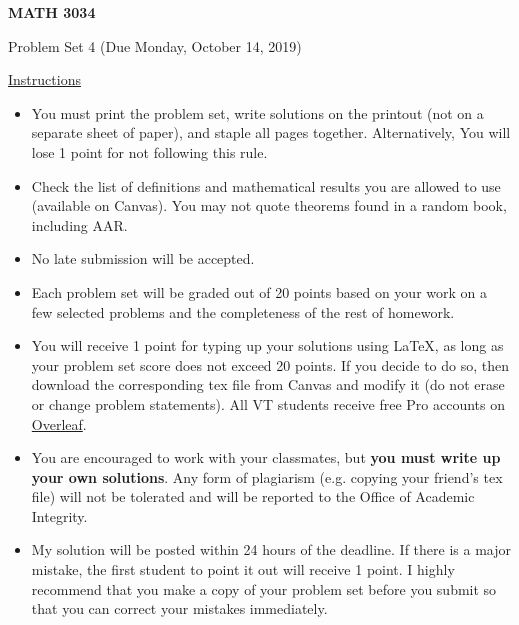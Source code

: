 \documentclass[12pt]{amsart}
\begin{document}

\hfill{}

\vspace{0.3in}
\begin{center}
{\Large{\textbf{MATH 3034}}}

\vspace{0.1in}
{\large{Problem Set 4 (Due Monday, October 14, 2019)}}
\end{center}

\vspace{0.3in}
\noindent
\underline{Instructions}
\begin{itemize}
\vspace{0.1in}
\item You must print the problem set, write solutions on the printout (not on a separate sheet of paper), and staple all pages together.  Alternatively,  You will lose 1 point for not following this rule.
\vspace{0.1in}
\item Check the list of definitions and mathematical results you are allowed to use (available on Canvas).  You may not quote theorems found in a random book, including AAR.
\vspace{0.1in}
\item No late submission will be accepted.
\vspace{0.1in}
\item Each problem set will be graded out of 20 points based on your work on a few selected problems and the completeness of the rest of homework.
\vspace{0.1in}
\item You will receive 1 point for typing up your solutions using \LaTeX, as long as your problem set score does not exceed 20 points.  If you decide to do so, then download the corresponding tex file from Canvas and modify it (do not erase or change problem statements).  All VT students receive free Pro accounts on \href{https://www.overleaf.com/edu/vtech}{Overleaf}.
\vspace{0.1in}
\item You are encouraged to work with your classmates, but \textbf{you must write up your own solutions}.  Any form of plagiarism (e.g. copying your friend's tex file) will not be tolerated and will be reported to the Office of Academic Integrity.
\vspace{0.1in}
\item My solution will be posted within 24 hours of the deadline.  If there is a major mistake, the first student to point it out will receive 1 point.  I highly recommend that you make a copy of your problem set before you submit so that you can correct your mistakes immediately.
\end{itemize}
\end{document}
